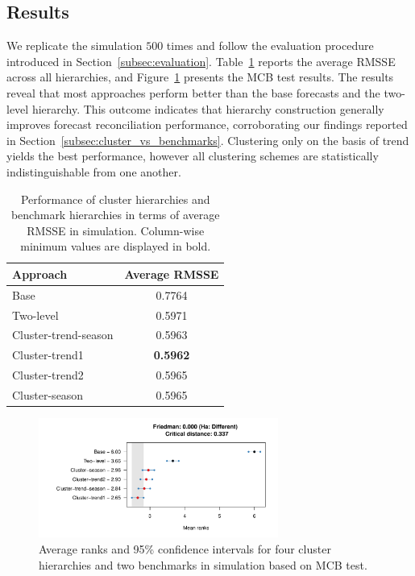 \documentclass[a4paper,review,12pt,authoryear]{elsarticle}
\begin{document}
\subsection{Results}
\label{sec:simu_res}

We replicate the simulation $500$ times and follow the evaluation procedure introduced in Section~\ref{subsec:evaluation}.
Table~\ref{tab:simu_P3} reports the average RMSSE across all hierarchies, and
Figure~\ref{fig:simu_P3_benchmarks} presents the MCB test results. The results reveal that most approaches perform better than the base forecasts and the two-level hierarchy. This outcome indicates that hierarchy construction generally improves forecast reconciliation performance, corroborating our findings reported in Section~\ref{subsec:cluster_vs_benchmarks}. 
Clustering only on the basis of trend yields the best performance, however all clustering schemes are statistically indistinguishable from one another. 


\begin{table}[h!]
    \centering
    \caption{\label{tab:simu_P3}Performance of cluster hierarchies and benchmark hierarchies in terms of average RMSSE in simulation. Column-wise minimum values are displayed in bold.}
    \begin{tabular}{lc}\toprule
        Approach & Average RMSSE \\ \midrule
        Base & 0.7764 \\ 
        Two-level & 0.5971 \\ 
        Cluster-trend-season & 0.5963 \\ 
        Cluster-trend1 & \textbf{0.5962} \\ 
        Cluster-trend2 & 0.5965 \\ 
        Cluster-season & 0.5965 \\ \bottomrule
    \end{tabular}
\end{table}


\begin{figure}[h!]
    \centering
    \vspace{0.1in}\includegraphics[width=0.7\textwidth]{figures/hierarchy_rmsse/simulation/P3_mcb.pdf}
   \vspace{-0.1in}
\caption{\label{fig:simu_P3_benchmarks}Average ranks and 95\% confidence intervals for four cluster hierarchies and two benchmarks in simulation based on MCB test.}
\end{figure}
\end{document}
